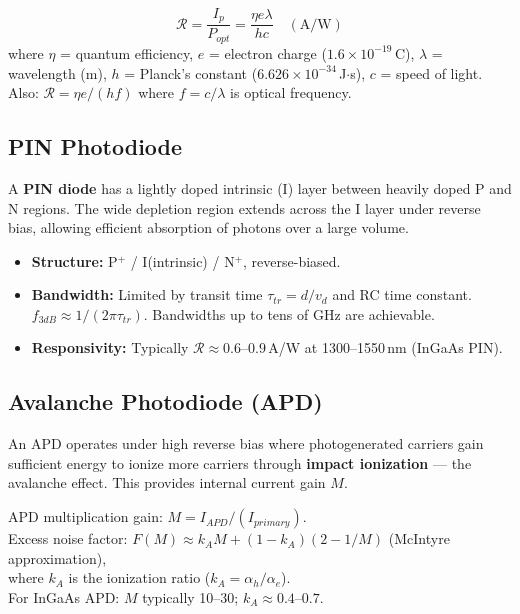 \documentclass[12pt,a4paper]{article}
\begin{document}
\begin{tcolorbox}[formulabox, title={\textbf{Responsivity Formula}}]
\[
\mathcal{R} = \frac{I_p}{P_{opt}} = \frac{\eta e \lambda}{hc} \quad (\text{A/W})
\]
where $\eta$ = quantum efficiency, $e$ = electron charge ($1.6\times10^{-19}$\,C), $\lambda$ = wavelength (m), $h$ = Planck's constant ($6.626\times10^{-34}$\,J$\cdot$s), $c$ = speed of light. \\
Also: $\mathcal{R} = \eta e / (hf)$ where $f = c/\lambda$ is optical frequency.
\end{tcolorbox}

\subsection{PIN Photodiode}
A \textbf{PIN diode} has a lightly doped intrinsic (I) layer between heavily doped P and N regions. The wide depletion region extends across the I layer under reverse bias, allowing efficient absorption of photons over a large volume.

\begin{itemize}[leftmargin=*, itemsep=2pt]
  \item \textbf{Structure:} P$^+$ / I(intrinsic) / N$^+$, reverse-biased.
  \item \textbf{Bandwidth:} Limited by transit time $\tau_{tr} = d/v_d$ and RC time constant. $f_{3dB} \approx 1/(2\pi\tau_{tr})$. Bandwidths up to tens of GHz are achievable.
  \item \textbf{Responsivity:} Typically $\mathcal{R} \approx 0.6$--$0.9$\,A/W at 1300--1550\,nm (InGaAs PIN).
\end{itemize}

\subsection{Avalanche Photodiode (APD)}
An APD operates under high reverse bias where photogenerated carriers gain sufficient energy to ionize more carriers through \textbf{impact ionization} --- the avalanche effect. This provides internal current gain $M$.

\begin{tcolorbox}[formulabox, title={\textbf{APD Gain, Noise, and SNR}}]
APD multiplication gain: $M = I_{APD}/(I_{primary})$. \\
Excess noise factor: $F(M) \approx k_A M + (1 - k_A)(2 - 1/M)$ (McIntyre approximation), \\
where $k_A$ is the ionization ratio ($k_A = \alpha_h/\alpha_e$). \\
For InGaAs APD: $M$ typically 10--30; $k_A \approx 0.4$--$0.7$.
\end{tcolorbox}
\end{document}
